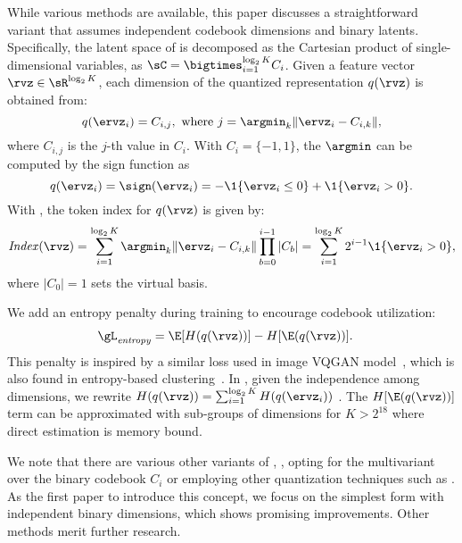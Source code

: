 While various \quantizername{} methods are available, this paper discusses a straightforward variant that assumes independent codebook dimensions and binary latents. 
Specifically, the latent space of \quantizername{} is decomposed as the Cartesian product of single-dimensional variables, as $\sC = \bigtimes_{i=1}^{\log_2{K}}C_i$.
Given a feature vector $\rvz \in \sR^{\log_2{K}}$, each dimension of the quantized representation $q(\rvz)$ is obtained from:
\begin{equation}
    q(\ervz_i) = C_{i, j}, \text{ where } j = \argmin_k \|\ervz_i - C_{i, k}\|,
\end{equation}
where $C_{i, j}$ is the $j$-th value in $C_i$.
With $C_i = \{-1, 1\}$, the $\argmin$ can be computed by the sign function as 
\begin{equation}
    q(\ervz_i) = \sign(\ervz_i) = -\1\{\ervz_i \le 0\} + \1\{\ervz_i > 0\}.
\end{equation}
With \quantizername{}, the token index for $q(\rvz)$ is given by:
\begin{equation}
\vspace{-1mm}
\mathit{Index}(\rvz) = \sum_{i=1}^{\log_2{K}} \argmin_k \|\ervz_i - C_{i, k}\| \prod_{b=0}^{i-1} |C_b| = \sum_{i=1}^{\log_2{K}} 2^{i-1} \1\{\ervz_i > 0\}, \label{eq:tokenid}
\end{equation}
where $|C_0|=1$ sets the virtual basis.

We add an entropy penalty during training to encourage codebook utilization:
\begin{align}
    \gL_\mathit{entropy} &= \E[H(q(\rvz))] - H[\E(q(\rvz))].
    \label{eq:entropy}
\end{align}
This penalty is inspired by a similar loss used in image VQGAN model~\citep{chang2022maskgit}, which is also found in entropy-based clustering~\citep{jansen2020coincidence}. In \quantizername{}, given the independence among dimensions, we rewrite $H(q(\rvz)) = \sum_{i=1}^{\log_2{K}} H(q (\ervz_i))$ .
The $H[\E(q(\rvz))]$ term can be approximated with sub-groups of dimensions for $K>2^{18}$ where direct estimation is memory bound. 

We note that there are various other variants of \quantizername{}, \eg, opting for the multivariant over the binary codebook $C_i$ or employing other quantization techniques such as \citet{agustsson2019generative}.
As the first paper to introduce this concept, we focus on the simplest form with independent binary dimensions, which shows promising improvements. Other \quantizername{} methods merit further research. 

